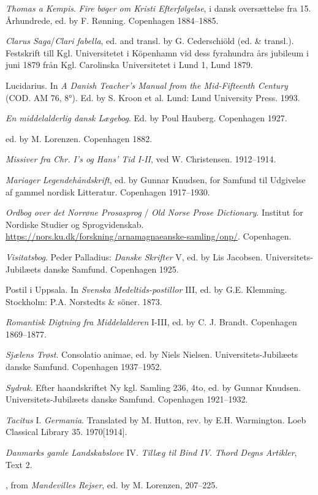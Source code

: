 \documentclass[output=paper]{langscibook}
\begin{document}
\begin{description}[font=\normalfont]
\item[Kempis:]  \textit{Thomas a Kempis}. \textit{Fire bøger om Kristi Efterfølgelse}, i dansk oversættelse fra 15. Århundrede, ed. by F. Rønning. Copenhagen 1884--1885.
\item[ClarB:]    \textit{Clarus Saga}\slash\textit{Clari fabella}, ed. and transl. by G. Cederschiöld (ed. \& transl.). Festskrift till Kgl. Universitetet i Köpenhamn vid dess fyrahundra års jubileum i juni 1879 från Kgl. Carolinska Universitetet i Lund 1, Lund 1879.
\item[Luc:]  Lucidarius. In \textit{A Danish Teacher's Manual from the Mid-Fifteenth Century} (COD. AM 76, 8°). Ed. by S. Kroon et al. Lund: Lund University Press. 1993.
\item[Lægeb Thott:]  \textit{En middelalderlig dansk Lægebog}. Ed. by Poul Hauberg. Copenhagen 1927.
\item[Mandevilles Rejse i gammeldansk Oversættelse,] ed. by M. Lorenzen. Copenhagen 1882. 
\item[Miss:]  \textit{Missiver fra Chr. I's og Hans' Tid I-II}, ved W. Christensen. 1912--1914.
\item[ML:]  \textit{Mariager Legendehåndskrift}, ed. by Gunnar Knudsen, for Samfund til Udgivelse af gammel nordisk Litteratur. Copenhagen 1917--1930.
\item[ONP:]  \textit{Ordbog over det Norrøne Prosasprog} / \textit{Old Norse Prose Dictionary}. Institut for Nordiske Studier og Sprogvidenskab. \url{https://nors.ku.dk/forskning/arnamagnaeanske-samling/onp/}. Copenhagen.
\item[Palladius:]  \textit{Visitatsbog}. Peder Palladius: \textit{Danske Skrifter} V, ed. by Lis Jacobsen. Universitets-Jubilæets danske Samfund. Copenhagen 1925.
\item[Post:]  Postil i Uppsala. In \textit{Svenska Medeltids-postillor} III, ed. by G.E. Klemming. Stockholm: P.A. Norstedts \& söner. 1873.
\item[RD:]  \textit{Romantisk Digtning fra Middelalderen} I-III, ed. by C. J. Brandt. Copenhagen 1869--1877. 
\item[SjT:]  \textit{Sjælens Trøst}. Consolatio animae, ed. by Niels Nielsen. Universitets-Jubilæets danske Samfund. Copenhagen 1937--1952.
\item[Sydr:]  \textit{Sydrak}. Efter haandskriftet Ny kgl. Samling 236, 4to, ed. by Gunnar Knudsen. Universitets-Jubilæets danske Samfund. Copenhagen 1921--1932.
\item[Tacitus Germ.:]   \textit{Tacitus} I. \textit{Germania}. Translated by M. Hutton, rev. by E.H. Warmington. Loeb Classical Library 35. 1970[1914].
\item[Thord Degn text 2:]  \textit{Danmarks gamle Landskabslove} IV. \textit{Tillæg til Bind IV}. \textit{Thord Degns Artikler}, Text 2.
\item[VejlPilgr:]   [A Pilgrim's Manual], from \textit{Mandevilles Rejser}, ed. by M. Lorenzen, 207--225.
\end{description}


{\sloppy\printbibliography[heading=subbibliography,notkeyword=this]}
\end{document}

